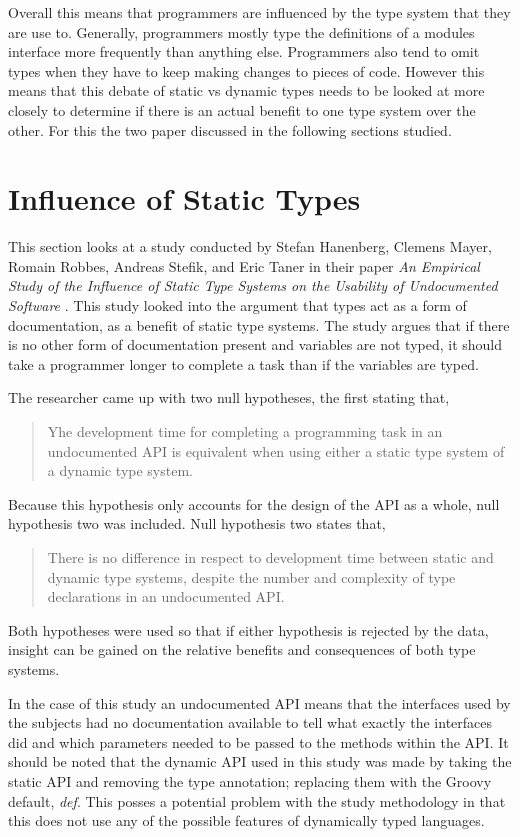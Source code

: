 \documentclass{sig-alternate}
\begin{document}
Overall this means that programmers are influenced by the type system that they are use to. Generally, programmers mostly type the definitions of a modules interface more frequently than anything else. Programmers also tend to omit types when they have to keep making changes to pieces of code. However this means that this debate of static vs dynamic types needs to be looked at more closely to determine if there is an actual benefit to one type system over the other. For this the two paper discussed in the following sections studied. 

\section{Influence of Static Types}\label{influence}
This section looks at a study conducted by Stefan Hanenberg, Clemens Mayer, Romain Robbes, Andreas Stefik, and Eric Taner in their paper \emph{An Empirical Study of the Influence of Static Type Systems on the Usability of Undocumented Software} \cite{Mayer2012}. This study looked into the argument that types act as a form of documentation, as a benefit of static type systems. The study argues that if there is no other form of documentation present and variables are not typed, it should take a programmer longer to complete a task than if the variables are typed. 

The researcher came up with two null hypotheses, the first stating that, 
\begin{quote}
Yhe development time for completing a programming task in an undocumented API is equivalent when using either a static type system of a dynamic type system.\cite{Mayer2012}
\end{quote} Because this hypothesis only accounts for the design of the API as a whole, null hypothesis two was included. Null hypothesis two states that,
\begin{quote}
There is no difference in respect to development time between static and dynamic type systems, despite the number and complexity of type declarations in an undocumented API. \cite{Mayer2012}
\end{quote} 
Both hypotheses were used so that if either hypothesis is rejected by the data, insight can be gained on the relative benefits and consequences of both type systems.

In the case of this study an undocumented API means that the interfaces used by the subjects had no documentation available to tell what exactly the interfaces did and which parameters needed to be passed to the methods within the API. It should be noted that the dynamic API used in this study was made by taking the static API and removing the type annotation; replacing them with the Groovy default, \emph{def}. This posses a potential problem with the study methodology in that this does not use any of the possible features of dynamically typed languages.
\end{document}
